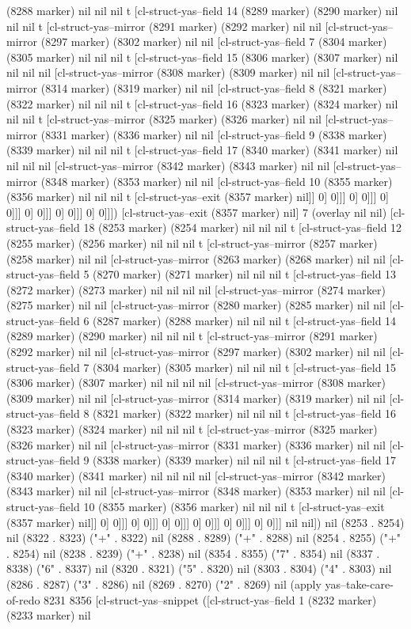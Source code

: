 {{(8288 marker) nil nil nil t [cl-struct-yas--field 14 (8289 marker) (8290 marker) nil nil nil t [cl-struct-yas--mirror (8291 marker) (8292 marker) nil nil [cl-struct-yas--mirror (8297 marker) (8302 marker) nil nil [cl-struct-yas--field 7 (8304 marker) (8305 marker) nil nil nil t [cl-struct-yas--field 15 (8306 marker) (8307 marker) nil nil nil nil [cl-struct-yas--mirror (8308 marker) (8309 marker) nil nil [cl-struct-yas--mirror (8314 marker) (8319 marker) nil nil [cl-struct-yas--field 8 (8321 marker) (8322 marker) nil nil nil t [cl-struct-yas--field 16 (8323 marker) (8324 marker) nil nil nil t [cl-struct-yas--mirror (8325 marker) (8326 marker) nil nil [cl-struct-yas--mirror (8331 marker) (8336 marker) nil nil [cl-struct-yas--field 9 (8338 marker) (8339 marker) nil nil nil t [cl-struct-yas--field 17 (8340 marker) (8341 marker) nil nil nil nil [cl-struct-yas--mirror (8342 marker) (8343 marker) nil nil [cl-struct-yas--mirror (8348 marker) (8353 marker) nil nil [cl-struct-yas--field 10 (8355 marker) (8356 marker) nil nil nil t [cl-struct-yas--exit (8357 marker) nil]] 0] 0]]] 0] 0]]] 0] 0]]] 0] 0]]] 0] 0]]] 0] 0]]]) [cl-struct-yas--exit (8357 marker) nil] 7 (overlay nil nil) [cl-struct-yas--field 18 (8253 marker) (8254 marker) nil nil nil t [cl-struct-yas--field 12 (8255 marker) (8256 marker) nil nil nil t [cl-struct-yas--mirror (8257 marker) (8258 marker) nil nil [cl-struct-yas--mirror (8263 marker) (8268 marker) nil nil [cl-struct-yas--field 5 (8270 marker) (8271 marker) nil nil nil t [cl-struct-yas--field 13 (8272 marker) (8273 marker) nil nil nil nil [cl-struct-yas--mirror (8274 marker) (8275 marker) nil nil [cl-struct-yas--mirror (8280 marker) (8285 marker) nil nil [cl-struct-yas--field 6 (8287 marker) (8288 marker) nil nil nil t [cl-struct-yas--field 14 (8289 marker) (8290 marker) nil nil nil t [cl-struct-yas--mirror (8291 marker) (8292 marker) nil nil [cl-struct-yas--mirror (8297 marker) (8302 marker) nil nil [cl-struct-yas--field 7 (8304 marker) (8305 marker) nil nil nil t [cl-struct-yas--field 15 (8306 marker) (8307 marker) nil nil nil nil [cl-struct-yas--mirror (8308 marker) (8309 marker) nil nil [cl-struct-yas--mirror (8314 marker) (8319 marker) nil nil [cl-struct-yas--field 8 (8321 marker) (8322 marker) nil nil nil t [cl-struct-yas--field 16 (8323 marker) (8324 marker) nil nil nil t [cl-struct-yas--mirror (8325 marker) (8326 marker) nil nil [cl-struct-yas--mirror (8331 marker) (8336 marker) nil nil [cl-struct-yas--field 9 (8338 marker) (8339 marker) nil nil nil t [cl-struct-yas--field 17 (8340 marker) (8341 marker) nil nil nil nil [cl-struct-yas--mirror (8342 marker) (8343 marker) nil nil [cl-struct-yas--mirror (8348 marker) (8353 marker) nil nil [cl-struct-yas--field 10 (8355 marker) (8356 marker) nil nil nil t [cl-struct-yas--exit (8357 marker) nil]] 0] 0]]] 0] 0]]] 0] 0]]] 0] 0]]] 0] 0]]] 0] 0]]] nil nil]) nil (8253 . 8254) nil (8322 . 8323) ("+" . 8322) nil (8288 . 8289) ("+" . 8288) nil (8254 . 8255) ("+" . 8254) nil (8238 . 8239) ("+" . 8238) nil (8354 . 8355) ("7" . 8354) nil (8337 . 8338) ("6" . 8337) nil (8320 . 8321) ("5" . 8320) nil (8303 . 8304) ("4" . 8303) nil (8286 . 8287) ("3" . 8286) nil (8269 . 8270) ("2" . 8269) nil (apply yas--take-care-of-redo 8231 8356 [cl-struct-yas--snippet ([cl-struct-yas--field 1 (8232 marker) (8233 marker) nil }}
